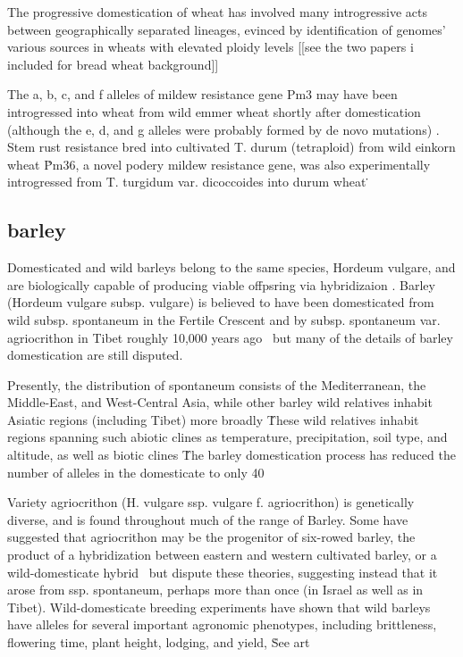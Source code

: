 \documentclass[11pt]{article}
\begin{document}
The progressive domestication of wheat has involved many introgressive acts between geographically separated lineages, evinced by identification of genomes' various sources in wheats with elevated ploidy levels [[see the two papers i included for bread wheat background]]

The a, b, c, and f alleles of mildew resistance gene Pm3 may have been introgressed into wheat from wild emmer wheat shortly after domestication (although the e, d, and g alleles were probably formed by de novo mutations) \cite{TPJ:TPJ2772}.
Stem rust resistance bred into cultivated T. durum (tetraploid) from wild einkorn wheat \cite{gerechter1971transfer}\.
Pm36, a novel podery mildew resistance gene, was also experimentally introgressed from T. turgidum var. dicoccoides into durum wheat \cite{blanco2008molecular}\.

\subsection*{barley}

Domesticated and wild barleys belong to the same species, Hordeum vulgare, and are biologically capable of producing viable offpsring via hybridizaion \cite{von1995ecographical}.
Barley (Hordeum vulgare subsp. vulgare) is believed to have been domesticated from wild subsp. spontaneum in the Fertile Crescent and by subsp. spontaneum var. agriocrithon in Tibet roughly 10,000 years ago \cite{takahashi1955origin, badr2000origin, oka2012origin, azhaguvel2007phylogenetic, haberer2015barley}\, but many of the details of barley domestication are still disputed.

Presently, the distribution of spontaneum consists of the Mediterranean, the Middle-East, and West-Central Asia, while other barley wild relatives inhabit Asiatic regions (including Tibet) more broadly \cite{nevo2010drought, harlan1995living}\.
These wild relatives inhabit regions spanning such abiotic clines as temperature, precipitation, soil type, and altitude, as well as biotic clines \cite{nevo2010drought}\.

The barley domestication process has reduced the number of alleles in the domesticate to only 40%

Variety agriocrithon (H. vulgare ssp. vulgare f. agriocrithon) is genetically diverse, and is found throughout much of the range of Barley.
Some have suggested that agriocrithon may be the progenitor of six-rowed barley, the product of a hybridization between eastern and western cultivated barley, or a wild-domesticate hybrid \cite{staudt1961origin, zohary1959hordeum, murphy1982origin}\, but \cite{azhaguvel2007phylogenetic} dispute these theories, suggesting instead that it arose from ssp. spontaneum, perhaps more than once (in Israel as well as in Tibet).
Wild-domesticate breeding experiments have shown that wild barleys have alleles for several important agronomic phenotypes, including brittleness, flowering time, plant height, lodging, and yield,  \cite{von2006ab, handley1994chromosome}\.
See art%
\end{document}
